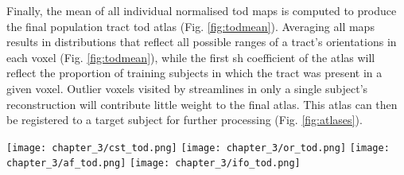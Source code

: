 Finally, the mean of all individual normalised \gls{tod} maps is computed to produce the final population tract \gls{tod} atlas (Fig. \ref{fig:todmean}).
Averaging all maps results in distributions that reflect all possible ranges of a tract's orientations in each voxel (Fig. \ref{fig:todmean}), while the first \gls{sh} coefficient of the atlas will reflect the proportion of training subjects in which the tract was present in a given voxel.
Outlier voxels visited by streamlines in only a single subject's reconstruction will contribute little weight to the final atlas.
This atlas can then be registered to a target subject for further processing (Fig. \ref{fig:atlases}).

%

\begin{figure*}[htb!]
  \centering
    \texttt{[image: chapter\_3/cst\_tod.png]}%
    \texttt{[image: chapter\_3/or\_tod.png]}
    \texttt{[image: chapter\_3/af\_tod.png]}%
    \texttt{[image: chapter\_3/ifo\_tod.png]}
  \caption{Tract orientation atlases, composite images projected onto coronal (CST), axial (OR, IFOF) and sagittal (AF) views in MNI152 reference space. Reproduced from \textcite{Young2024}}\label{fig:atlases}
\end{figure*}
